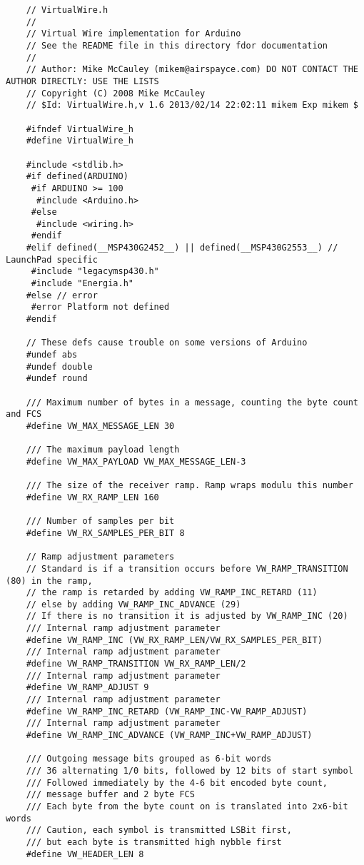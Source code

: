 \begin{verbatim}
    // VirtualWire.h
    //
    // Virtual Wire implementation for Arduino
    // See the README file in this directory fdor documentation
    // 
    // Author: Mike McCauley (mikem@airspayce.com) DO NOT CONTACT THE AUTHOR DIRECTLY: USE THE LISTS
    // Copyright (C) 2008 Mike McCauley
    // $Id: VirtualWire.h,v 1.6 2013/02/14 22:02:11 mikem Exp mikem $

    #ifndef VirtualWire_h
    #define VirtualWire_h

    #include <stdlib.h>
    #if defined(ARDUINO)
     #if ARDUINO >= 100
      #include <Arduino.h>
     #else
      #include <wiring.h>
     #endif
    #elif defined(__MSP430G2452__) || defined(__MSP430G2553__) // LaunchPad specific
     #include "legacymsp430.h"
     #include "Energia.h"
    #else // error
     #error Platform not defined
    #endif

    // These defs cause trouble on some versions of Arduino
    #undef abs
    #undef double
    #undef round

    /// Maximum number of bytes in a message, counting the byte count and FCS
    #define VW_MAX_MESSAGE_LEN 30

    /// The maximum payload length
    #define VW_MAX_PAYLOAD VW_MAX_MESSAGE_LEN-3

    /// The size of the receiver ramp. Ramp wraps modulu this number
    #define VW_RX_RAMP_LEN 160

    /// Number of samples per bit
    #define VW_RX_SAMPLES_PER_BIT 8

    // Ramp adjustment parameters
    // Standard is if a transition occurs before VW_RAMP_TRANSITION (80) in the ramp,
    // the ramp is retarded by adding VW_RAMP_INC_RETARD (11)
    // else by adding VW_RAMP_INC_ADVANCE (29)
    // If there is no transition it is adjusted by VW_RAMP_INC (20)
    /// Internal ramp adjustment parameter
    #define VW_RAMP_INC (VW_RX_RAMP_LEN/VW_RX_SAMPLES_PER_BIT)
    /// Internal ramp adjustment parameter
    #define VW_RAMP_TRANSITION VW_RX_RAMP_LEN/2
    /// Internal ramp adjustment parameter
    #define VW_RAMP_ADJUST 9
    /// Internal ramp adjustment parameter
    #define VW_RAMP_INC_RETARD (VW_RAMP_INC-VW_RAMP_ADJUST)
    /// Internal ramp adjustment parameter
    #define VW_RAMP_INC_ADVANCE (VW_RAMP_INC+VW_RAMP_ADJUST)

    /// Outgoing message bits grouped as 6-bit words
    /// 36 alternating 1/0 bits, followed by 12 bits of start symbol
    /// Followed immediately by the 4-6 bit encoded byte count, 
    /// message buffer and 2 byte FCS
    /// Each byte from the byte count on is translated into 2x6-bit words
    /// Caution, each symbol is transmitted LSBit first, 
    /// but each byte is transmitted high nybble first
    #define VW_HEADER_LEN 8


\end{verbatim}
